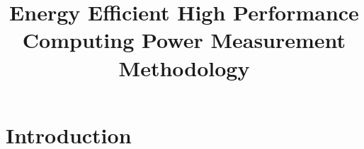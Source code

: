 \documentclass[runningheads]{scrreprt}
\begin{document}
\pagestyle{headings}  %

\title{
Energy Efficient High Performance Computing Power Measurement Methodology
}


\date{ }
\maketitle              %

\def\wl{\par \vspace{\baselineskip}}

%
\chapter{Introduction}

\label{sec:intro}


\newpage
\end{document}
